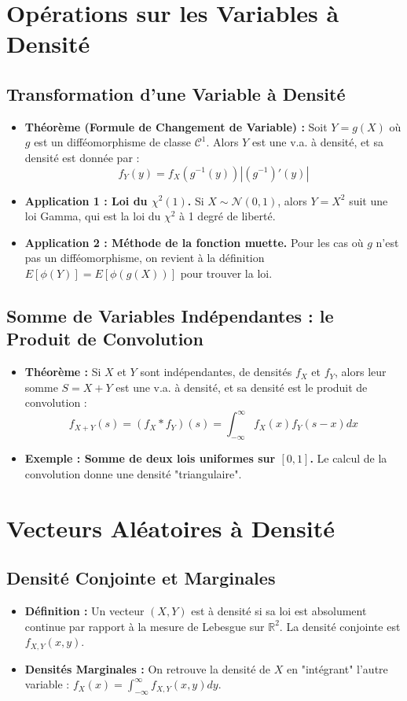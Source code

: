 \documentclass[12pt, a4paper, parskip=full]{report}
\theoremstyle{agregstyle}
\begin{document}
\section{Opérations sur les Variables à Densité}
\subsection{Transformation d'une Variable à Densité}
\begin{itemize}
    \item \textbf{Théorème (Formule de Changement de Variable) :} Soit $Y=g(X)$ où $g$ est un difféomorphisme de classe $\mathcal{C}^1$. Alors $Y$ est une v.a. à densité, et sa densité est donnée par :
    $$ f_Y(y) = f_X(g^{-1}(y)) |(g^{-1})'(y)| $$
    \item \textbf{Application 1 : Loi du $\chi^2(1)$.} Si $X \sim \mathcal{N}(0,1)$, alors $Y=X^2$ suit une loi Gamma, qui est la loi du $\chi^2$ à 1 degré de liberté.
    \item \textbf{Application 2 : Méthode de la fonction muette.} Pour les cas où $g$ n'est pas un difféomorphisme, on revient à la définition $E[\phi(Y)] = E[\phi(g(X))]$ pour trouver la loi.
\end{itemize}
\subsection{Somme de Variables Indépendantes : le Produit de Convolution}
\begin{itemize}
    \item \textbf{Théorème :} Si $X$ et $Y$ sont indépendantes, de densités $f_X$ et $f_Y$, alors leur somme $S=X+Y$ est une v.a. à densité, et sa densité est le produit de convolution :
    $$ f_{X+Y}(s) = (f_X * f_Y)(s) = \int_{-\infty}^{\infty} f_X(x) f_Y(s-x) dx $$
    \item \textbf{Exemple : Somme de deux lois uniformes sur $[0,1]$.} Le calcul de la convolution donne une densité "triangulaire".
\end{itemize}

\section{Vecteurs Aléatoires à Densité}
\subsection{Densité Conjointe et Marginales}
\begin{itemize}
    \item \textbf{Définition :} Un vecteur $(X,Y)$ est à densité si sa loi est absolument continue par rapport à la mesure de Lebesgue sur $\mathbb{R}^2$. La densité conjointe est $f_{X,Y}(x,y)$.
    \item \textbf{Densités Marginales :} On retrouve la densité de $X$ en "intégrant" l'autre variable : $f_X(x) = \int_{-\infty}^{\infty} f_{X,Y}(x,y) dy$.
\end{itemize}
\end{document}
